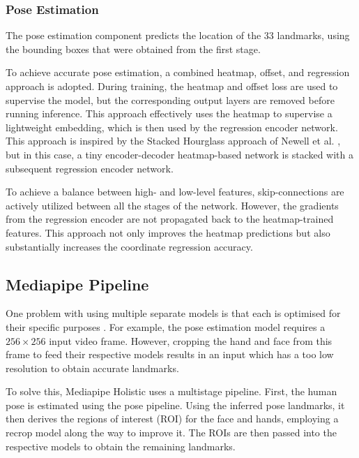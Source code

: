 \documentclass[final,rdr32.tex]{subfiles}
\begin{document}
\subsubsection{Pose Estimation}

The pose estimation component predicts the location of the 33 landmarks, using the bounding boxes that were obtained from the first stage.

To achieve accurate pose estimation, a combined heatmap, offset, and regression approach is adopted. During training, the heatmap and offset loss are used to supervise the model, but the corresponding output layers are removed before running inference. This approach effectively uses the heatmap to supervise a lightweight embedding, which is then used by the regression encoder network. This approach is inspired by the Stacked Hourglass approach of Newell et al. \cite{newell2016stacked}, but in this case, a tiny encoder-decoder heatmap-based network is stacked with a subsequent regression encoder network.

To achieve a balance between high- and low-level features, skip-connections are actively utilized between all the stages of the network. However, the gradients from the regression encoder are not propagated back to the heatmap-trained features. This approach not only improves the heatmap predictions but also substantially increases the coordinate regression accuracy.

\subsection{Mediapipe Pipeline}

One problem with using multiple separate models is that each is optimised for their specific purposes \cite{grishchenko_bazarevsky_2020}. For example, the pose estimation model requires a $256 \times 256$ input video frame. However, cropping the hand and face from this frame to feed their respective models results in an input which has a too low resolution to obtain accurate landmarks.

To solve this, Mediapipe Holistic uses a multistage pipeline. First, the human pose is estimated using the pose pipeline. Using the inferred pose landmarks, it then derives the regions of interest (ROI) for the face and hands, employing a recrop model along the way to improve it. The ROIs are then passed into the respective models to obtain the remaining landmarks.

\newpage
\end{document}

